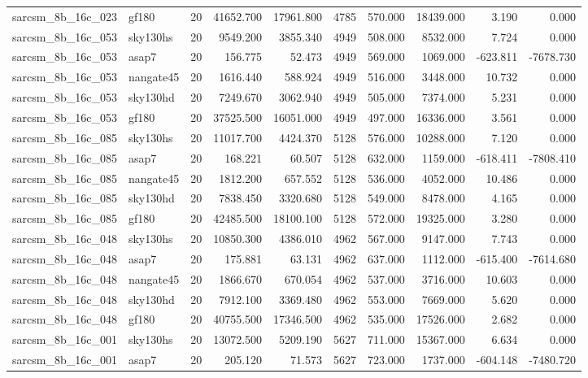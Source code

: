 \documentclass{article}
\begin{document}
\begin{longtable}{llrrrrrrrr}
sarcsm\_8b\_16c\_023 & gf180 & 20 & 41652.700 & 17961.800 & 4785 & 570.000 & 18439.000 & 3.190 & 0.000 \\
sarcsm\_8b\_16c\_053 & sky130hs & 20 & 9549.200 & 3855.340 & 4949 & 508.000 & 8532.000 & 7.724 & 0.000 \\
sarcsm\_8b\_16c\_053 & asap7 & 20 & 156.775 & 52.473 & 4949 & 569.000 & 1069.000 & -623.811 & -7678.730 \\
sarcsm\_8b\_16c\_053 & nangate45 & 20 & 1616.440 & 588.924 & 4949 & 516.000 & 3448.000 & 10.732 & 0.000 \\
sarcsm\_8b\_16c\_053 & sky130hd & 20 & 7249.670 & 3062.940 & 4949 & 505.000 & 7374.000 & 5.231 & 0.000 \\
sarcsm\_8b\_16c\_053 & gf180 & 20 & 37525.500 & 16051.000 & 4949 & 497.000 & 16336.000 & 3.561 & 0.000 \\
sarcsm\_8b\_16c\_085 & sky130hs & 20 & 11017.700 & 4424.370 & 5128 & 576.000 & 10288.000 & 7.120 & 0.000 \\
sarcsm\_8b\_16c\_085 & asap7 & 20 & 168.221 & 60.507 & 5128 & 632.000 & 1159.000 & -618.411 & -7808.410 \\
sarcsm\_8b\_16c\_085 & nangate45 & 20 & 1812.200 & 657.552 & 5128 & 536.000 & 4052.000 & 10.486 & 0.000 \\
sarcsm\_8b\_16c\_085 & sky130hd & 20 & 7838.450 & 3320.680 & 5128 & 549.000 & 8478.000 & 4.165 & 0.000 \\
sarcsm\_8b\_16c\_085 & gf180 & 20 & 42485.500 & 18100.100 & 5128 & 572.000 & 19325.000 & 3.280 & 0.000 \\
sarcsm\_8b\_16c\_048 & sky130hs & 20 & 10850.300 & 4386.010 & 4962 & 567.000 & 9147.000 & 7.743 & 0.000 \\
sarcsm\_8b\_16c\_048 & asap7 & 20 & 175.881 & 63.131 & 4962 & 637.000 & 1112.000 & -615.400 & -7614.680 \\
sarcsm\_8b\_16c\_048 & nangate45 & 20 & 1866.670 & 670.054 & 4962 & 537.000 & 3716.000 & 10.603 & 0.000 \\
sarcsm\_8b\_16c\_048 & sky130hd & 20 & 7912.100 & 3369.480 & 4962 & 553.000 & 7669.000 & 5.620 & 0.000 \\
sarcsm\_8b\_16c\_048 & gf180 & 20 & 40755.500 & 17346.500 & 4962 & 535.000 & 17526.000 & 2.682 & 0.000 \\
sarcsm\_8b\_16c\_001 & sky130hs & 20 & 13072.500 & 5209.190 & 5627 & 711.000 & 15367.000 & 6.634 & 0.000 \\
sarcsm\_8b\_16c\_001 & asap7 & 20 & 205.120 & 71.573 & 5627 & 723.000 & 1737.000 & -604.148 & -7480.720 \\

\end{longtable}
\end{document}
